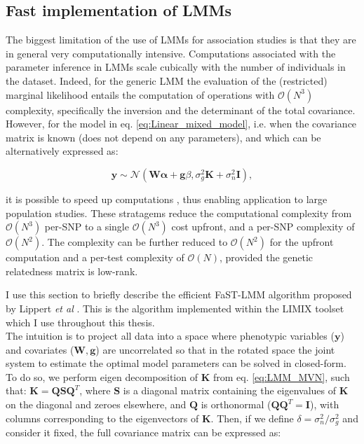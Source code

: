 \subsection{Fast implementation of LMMs}
\label{sec:fast_lmm}

The biggest limitation of the use of LMMs for association studies is that they are in general very computationally intensive.
Computations associated with the parameter inference in LMMs scale cubically with
the number of individuals in the dataset. 
Indeed, for the generic LMM
the evaluation of the (restricted) marginal likelihood entails the computation of operations with $\mathcal{O}(N^3)$ complexity, specifically the inversion and the determinant of the total covariance. 
However, for the model in eq. \eqref{eq:Linear_mixed_model}, i.e. when the covariance matrix is known (does not depend on any parameters), and which can be alternatively expressed as:

\begin{equation}\label{eq:LMM_MVN}
 \mathbf{y} \sim  \mathcal{N}(\mathbf{W}\boldsymbol{\alpha} + \mathbf{g}\beta, \sigma_g^2\mathbf{K} + \sigma_n^2\mathbf{I}),
\end{equation}

it is possible to speed up computations \cite{kang2008efficient, kang2010variance, lippert2011fast, zhou2012genome}, thus enabling application to large population studies. 
These stratagems reduce the computational complexity from $\mathcal{O}(N^3)$
per-SNP to a single  $\mathcal{O}(N^3)$ cost upfront, and a per-SNP complexity of  $\mathcal{O}(N^2)$.
The complexity can be further reduced to $\mathcal{O}(N^2)$ for the upfront computation and a per-test complexity of  $\mathcal{O}(N)$, provided the genetic relatedness matrix is low-rank. 

\newpage

I use this section to  briefly describe the efficient FaST-LMM algorithm proposed by Lippert \textit{et al} \cite{lippert2011fast}.
This is the algorithm implemented within the LIMIX toolset \cite{lippert2014limix,casale2015efficient} which I use throughout this thesis.
\\

The intuition is to project all data into a space where phenotypic variables ($\mathbf{y}$) and covariates ($\mathbf{W}, \mathbf{g}$) are uncorrelated so that in the rotated space the joint system to estimate the optimal model parameters can be solved in closed-form.
To do so, we perform eigen decomposition of $\mathbf{K}$ from eq. \eqref{eq:LMM_MVN}, such that: $\mathbf{K} = \mathbf{Q}\mathbf{S}\mathbf{Q}^T$, where $\mathbf{S}$ is a diagonal matrix containing the eigenvalues of $\mathbf{K}$ on the diagonal and zeroes elsewhere, and $\mathbf{Q}$ is orthonormal ($\mathbf{Q}\mathbf{Q}^T = \mathbf{I}$), with columns corresponding to the eigenvectors of $\mathbf{K}$. 
Then, if we define $\delta = \sigma_n^2/\sigma_g^2$ and consider it fixed, the full covariance matrix can be expressed as:

